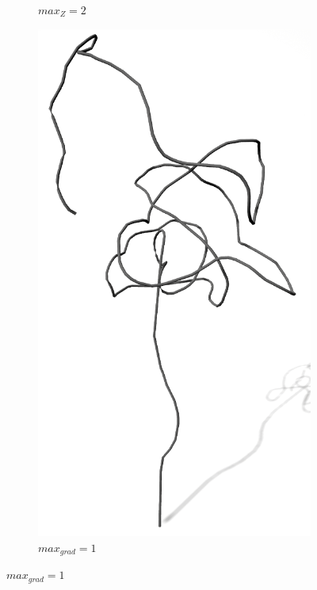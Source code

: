 \begin{figure} [hbtp]
\begin{subfigure}[t]{.45\textwidth}
		\caption{$max_Z = 2$}
		\label{subfig:SCA_Sonst_Zweigtiefe}
	\end{subfigure}
	\begin{subfigure}[t]{.45\textwidth}
		\centering
		\includegraphics[height=.21\textheight]{images/SCA_Sonst_Grad.png}
		\caption{$max_{grad} = 1$}
		\label{subfig:SCA_Sonst_Grad}
	\end{subfigure}
	\hspace{.05\linewidth}

\end{figure}
